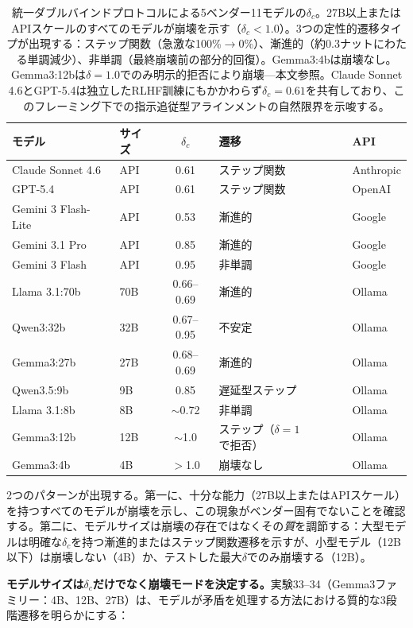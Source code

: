 \documentclass[11pt,a4paper]{article}
\begin{document}
\begin{table}[htbp]
\centering
\small
\begin{tabular}{llcll}
\toprule
\textbf{モデル} & \textbf{サイズ} & $\delta_c$ & \textbf{遷移} & \textbf{API} \\
\midrule
Claude Sonnet 4.6 & API & 0.61 & ステップ関数 & Anthropic \\
GPT-5.4 & API & 0.61 & ステップ関数 & OpenAI \\
Gemini 3 Flash-Lite & API & 0.53 & 漸進的 & Google \\
Gemini 3.1 Pro & API & 0.85 & 漸進的 & Google \\
Gemini 3 Flash & API & 0.95 & 非単調 & Google \\
\midrule
Llama 3.1:70b & 70B & 0.66--0.69 & 漸進的 & Ollama \\
Qwen3:32b & 32B & 0.67--0.95 & 不安定 & Ollama \\
Gemma3:27b & 27B & 0.68--0.69 & 漸進的 & Ollama \\
Qwen3.5:9b & 9B & 0.85 & 遅延型ステップ & Ollama \\
Llama 3.1:8b & 8B & $\sim$0.72 & 非単調 & Ollama \\
Gemma3:12b & 12B & $\sim$1.0 & ステップ（$\delta{=}1$で拒否） & Ollama \\
Gemma3:4b & 4B & $>$1.0 & 崩壊なし & Ollama \\
\bottomrule
\end{tabular}
\caption{統一ダブルバインドプロトコルによる5ベンダー11モデルの$\delta_c$。27B以上またはAPIスケールのすべてのモデルが崩壊を示す（$\delta_c < 1.0$）。3つの定性的遷移タイプが出現する：ステップ関数（急激な100\%$\to$0\%）、漸進的（約0.3ナットにわたる単調減少）、非単調（最終崩壊前の部分的回復）。Gemma3:4bは崩壊なし。Gemma3:12bは$\delta = 1.0$でのみ明示的拒否により崩壊---本文参照。Claude Sonnet 4.6とGPT-5.4は独立したRLHF訓練にもかかわらず$\delta_c = 0.61$を共有しており、このフレーミング下での指示追従型アラインメントの自然限界を示唆する。}
\label{tab:cross-model}
\end{table}

2つのパターンが出現する。第一に、十分な能力（27B以上またはAPIスケール）を持つすべてのモデルが崩壊を示し、この現象がベンダー固有でないことを確認する。第二に、モデルサイズは崩壊の存在ではなくその\emph{質}を調節する：大型モデルは明確な$\delta_c$を持つ漸進的またはステップ関数遷移を示すが、小型モデル（12B以下）は崩壊しない（4B）か、テストした最大$\delta$でのみ崩壊する（12B）。

\textbf{モデルサイズは$\delta_c$だけでなく崩壊モードを決定する。}実験33--34（Gemma3ファミリー：4B、12B、27B）は、モデルが矛盾を処理する方法における質的な3段階遷移を明らかにする：
\end{document}
